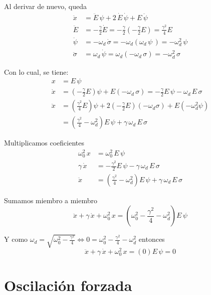 Al derivar de nuevo, queda
\begin{align*}
    \ddot{x} &= \ddot{E} \, \psi + 2 \, \dot{E} \, \dot{\psi} + E \, \ddot{\psi}
    \\
    \ddot{E} &= - \frac{\gamma}{2} \dot{E}
    = - \frac{\gamma}{2} \left(- \frac{\gamma}{2} E \right)
    = \frac{\gamma^2}{4} E
    \\
    \ddot{\psi} &= -\omega_d \, \dot{\sigma}
    =  - \omega_d \left( \omega_d \, \psi \, \right)
    = - \omega_d^2 \, \psi
    \\
    \ddot{\sigma} &= \omega_d \, \dot{\psi}
    = \omega_d \left( - \omega_d \, \sigma \right)
    = - \omega_d^2 \, \sigma
\end{align*}

Con lo cual, se tiene:
\begin{align*}
    x &= E \, \psi
    \\
    \dot{x} &= \left( - \frac{\gamma}{2} E \right) \psi + E  \left( -\omega_d \, \sigma \right)
    = - \frac{\gamma}{2} E \, \psi - \omega_d \, E \, \sigma
    \\
    \ddot{x} &= \left( \frac{\gamma^2}{4} E \right) \psi + 2 \left( - \frac{\gamma}{2} E \right) \left( -\omega_d \sigma \right) + E \left( - \omega_d^2 \psi \right)
    \\
    &= \left( \frac{\gamma^2}{4} - \omega_d^2 \right) E \, \psi + \gamma \, \omega_d \, E \, \sigma
\end{align*}

Multiplicamos coeficientes
\begin{align*}
    \omega_0^2 \, x &= \omega_0^2 \, E \, \psi
    \\
    \gamma \, \dot{x} &= - \frac{\gamma^2}{2} E \, \psi - \gamma \, \omega_d \, E \, \sigma
    \\
    \ddot{x} &= \left( \frac{\gamma^2}{4} - \omega_d^2 \right) E \, \psi + \gamma \, \omega_d \, E \, \sigma
\end{align*}

Sumamos miembro a miembro
\[
    \ddot{x} + \gamma \, \dot{x} + \omega_{0}^{2} \, x = \left( \omega_0^2 - \frac{\gamma^2}{4} - \omega_d^2 \right) E \, \psi
\]

Y como
$\omega_d = \sqrt{\omega_0^2 - \frac{\gamma^2}{4}} \iff 0 = \omega_0^2 - \frac{\gamma^2}{4} - \omega_d^2$
entonces
\[
  \ddot{x} + \gamma \, \dot{x} + \omega_{0}^{2} \, x = \left( 0 \right) E \, \psi = 0
\]


\section{Oscilación forzada}

